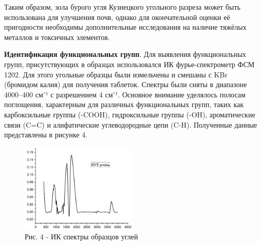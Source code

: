\begin{multicols}{2}
Таким образом, зола бурого угля Кузнецкого угольного разреза может быть
использована для улучшения почв, однако для окончательной оценки её
пригодности необходимы дополнительные исследования на наличие тяжёлых
металлов и токсичных элементов.

{\bfseries Идентификация функциональных групп}. Для выявления
функциональных групп, присутствующих в образцах использовался ИК
фурье-спектрометр ФСМ 1202. Для этого угольные образцы были измельчены и
смешаны с KBr (бромидом калия) для получения таблеток. Спектры были
сняты в диапазоне 4000--400 см⁻¹ с разрешением 4 см⁻¹. Основное внимание
уделялось полосам поглощения, характерным для различных функциональных
групп, таких как карбоксильные группы (-COOH), гидроксильные группы
(-OH), ароматические связи (C=C) и алифатические углеводородные цепи
(C-H). Полученные данные представлены в рисунке 4.
\end{multicols}

\begin{figure}[H]
	\centering
	\includegraphics[width=0.5\textwidth]{media/gorn3/image12}
	\caption*{Рис. 4 - ИК спектры образцов углей}
\end{figure}

